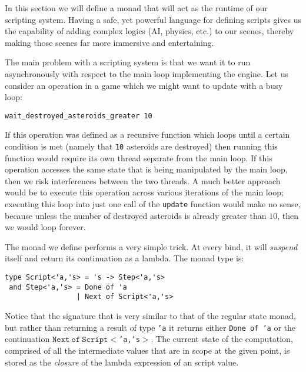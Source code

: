 
In this section we will define a monad that will act as the runtime of our scripting system.  Having a safe, yet powerful language for defining scripts gives us the capability of adding complex logics (AI, physics, etc.) to our scenes, thereby making those scenes far more immersive and entertaining.

The main problem with a scripting system is that we want it to run
asynchronously with respect to the main loop implementing the
engine. Let us consider an operation in a game which we might want to update with a busy loop:  

\begin{lstlisting}
wait_destroyed_asteroids_greater 10
\end{lstlisting}

If this operation was defined as a recursive function which loops
until a certain condition is met (namely that \texttt{10} asteroids
are destroyed) then running this function would require its own thread
separate from the main loop. If this operation accesses the same state
that is being manipulated by the main loop, then we risk interferences
between the two threads. A much better approach would be to execute
this operation across various iterations of the main loop; executing
this loop into just one call of the \texttt{update} function would
make no sense, because unless the number of destroyed asteroids is
already greater than $10$, then we would loop forever. 

The monad we define performs a very simple trick. At every bind, it will \textit{suspend} itself and return its continuation as a 
lambda. The monad type is: 

\begin{lstlisting}
type Script<'a,'s> = 's -> Step<'a,'s>
 and Step<'a,'s> = Done of 'a 
                 | Next of Script<'a,'s>
\end{lstlisting}

Notice that the signature that is very similar to that of the regular
state monad, but rather than returning a result of type \texttt{'a}
it returns either \texttt{Done\ of\ 'a} or the continuation 
$\mathtt{Next\ of\ Script<}$\texttt{'a,'s}$\mathtt{>}$. The current
state of the computation, comprised of all the intermediate values
that are in scope at the given point, is stored as the
\textit{closure} of the lambda expression of an script value.  

